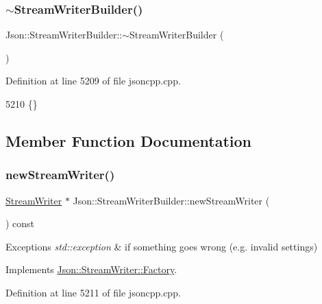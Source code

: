 \subsubsection{\texorpdfstring{$\sim$\+Stream\+Writer\+Builder()}{~StreamWriterBuilder()}}
{\footnotesize\ttfamily Json\+::\+Stream\+Writer\+Builder\+::$\sim$\+Stream\+Writer\+Builder (\begin{DoxyParamCaption}{ }\end{DoxyParamCaption})}



Definition at line 5209 of file jsoncpp.\+cpp.


\begin{DoxyCode}
5210 \{\}
\end{DoxyCode}


\subsection{Member Function Documentation}
\mbox{\label{class_json_1_1_stream_writer_builder_ab9ee278609f88ae04a7c1a84e1f559e6}} 
\subsubsection{\texorpdfstring{new\+Stream\+Writer()}{newStreamWriter()}}
{\footnotesize\ttfamily \hyperlink{class_json_1_1_stream_writer}{Stream\+Writer} $\ast$ Json\+::\+Stream\+Writer\+Builder\+::new\+Stream\+Writer (\begin{DoxyParamCaption}{ }\end{DoxyParamCaption}) const\hspace{0.3cm}{\ttfamily [virtual]}}


\begin{DoxyExceptions}{Exceptions}
{\em std\+::exception} & if something goes wrong (e.\+g. invalid settings) \\
\hline
\end{DoxyExceptions}


Implements \hyperlink{class_json_1_1_stream_writer_1_1_factory_a9d30ec53e8288cd53befccf1009c5f31}{Json\+::\+Stream\+Writer\+::\+Factory}.



Definition at line 5211 of file jsoncpp.\+cpp.



